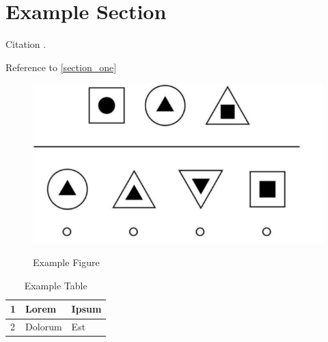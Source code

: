\documentclass{article}
\begin{document}
\section{Example Section}\label{section_one}

Citation \cite{aharonov2008quantum}.

Reference to \autoref{section_one}

\begin{figure}[H]
  \centering
  \includegraphics[scale=.5]{figures/example_figure.png} \\
  \caption{Example Figure}\label{fig:example_figure}
\end{figure}

\begin{table}[htbp]
  \centering
  \begin{tabularx}{\textwidth}{| p{1cm} | X | p{6cm} |}
    \hline
      1 & Lorem
        & Ipsum \\ \hline
      2 & Dolorum
        & Est \\ \hline
  \end{tabularx}
  \caption{Example Table}
\end{table}

\listoffigures
\listoftables
\printbibliography
\end{document}
